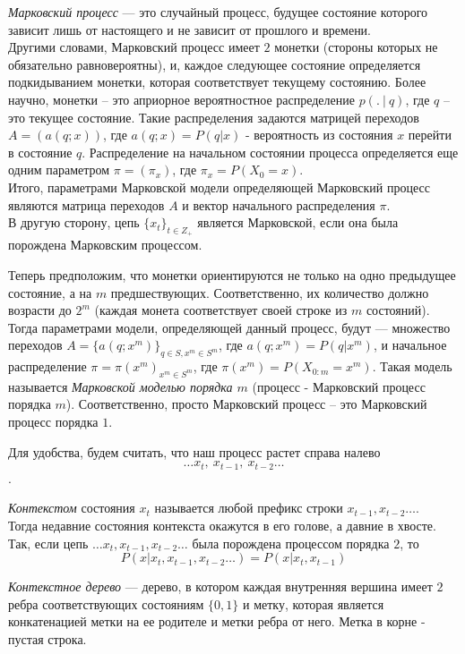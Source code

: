 \documentclass{matmex-diploma-custom}
\begin{document}
\textit{Марковский процесс} --- это случайный процесс, будущее состояние которого зависит лишь от настоящего и не зависит от прошлого и времени.
\\
Другими словами, Марковский процесс имеет $ 2 $ монетки (стороны которых не обязательно равновероятны), и, каждое следующее состояние определяется подкидыванием монетки, которая соответствует текущему состоянию.
Более научно, монетки -- это априорное вероятностное распределение $p(.~|~q)$, где $ q $ -- это текущее состояние.
Такие распределения задаются матрицей переходов $A = (a(q;x))$, где $a(q; x) = P(q|x)$ - вероятность из состояния $ x $ перейти в состояние $ q $.
Распределение на начальном состоянии процесса определяется еще одним параметром $ \pi = (\pi_{x})$, где $ \pi_{x}=P(X_{0}=x)$.
\\
Итого, параметрами Марковской модели определяющей Марковский процесс являются
матрица переходов $ A $ и вектор начального распределения $\pi$.
\\
В другую сторону,
цепь $ \{x_{t}\}_{t \in Z_{+}} $ является Марковской, если она была порождена Марковским процессом.

Теперь предположим, что монетки ориентируются не только на одно предыдущее состояние, а на $ m $ предшествующих. 
Соответственно, их количество должно возрасти до $2^{m}$ (каждая монета соответствует своей строке из $ m $ состояний).
Тогда параметрами модели, определяющей данный процесс, будут --- множество переходов $ A = \{a(q; x^{m})\}_{q \in S, x^{m} \in S^{m}}$, где $a(q; x^{m}) = P(q|x^{m})$, и начальное распределение $ \pi = \pi(x^m)_{x^m \in S^m}$, где $\pi(x^m) = P(X_{0:m}=x^m)$.
Такая модель называется \textit{Марковской моделью порядка $ m $} (процесс - Марковский процесс порядка $ m $).
Соответственно, просто Марковский процесс -- это Марковский процесс порядка $ 1 $.

Для удобства, будем считать, что наш процесс растет справа налево  
$$\ldots x_{t},~ x_{t-1},~ x_{t-2} \ldots$$.

\textit{Контекстом} состояния $ x_{t} $  называется любой префикс строки  $x_{t-1}, x_{t-2} \ldots$. 
\\
Тогда недавние состояния контекста окажутся в его голове, а давние в хвосте.
\\
Так,  если цепь $\ldots x_{t}, x_{t-1}, x_{t-2} \ldots$ была порождена процессом порядка $2$,
то $$P(x|x_{t},x_{t-1},x_{t-2}\ldots) = P(x|x_{t},x_{t-1})$$

\textit{Контекстное дерево} --- дерево, в котором каждая внутренняя вершина имеет $ 2 $ ребра соответствующих состояниям $\{0,1\}$ и метку, которая является конкатенацией метки на ее родителе и метки ребра от него. Метка в корне - пустая строка. 
\end{document}

